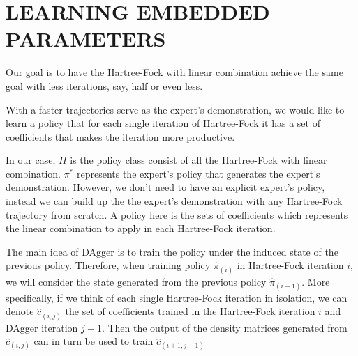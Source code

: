 \documentclass[twoside]{article}
\begin{document}

\section{LEARNING EMBEDDED PARAMETERS}

Our goal is to have the Hartree-Fock with linear combination achieve the same goal with less iterations, say, half or even less.  



% 

With a faster trajectories serve as the expert's demonstration, we would like to learn a policy that for each single iteration of Hartree-Fock it has a set of coefficients that makes the iteration more productive.   

In our case, $\Pi$ is the policy class consist of all the Hartree-Fock with linear combination. $\pi^*$ represents the expert's policy that generates the expert's demonstration. However, we don't need to have an explicit expert's policy, instead we can build up the the expert's demonstration with any Hartree-Fock trajectory from scratch. A policy here is the sets of coefficients which represents the linear combination to apply in each Hartree-Fock iteration. 




The main idea of DAgger is to train the policy under the induced state of the previous policy. Therefore, when training policy $\hat{\pi}_{(i)}$ in Hartree-Fock iteration $i$,
we will consider the state generated from the previous policy $\hat{\pi}_{(i-1)}$. More specifically, if we think of each single Hartree-Fock iteration in isolation, we can denote $\hat{c}_{(i,j)}$ the set of coefficients trained in the Hartree-Fock iteration $i$ and DAgger iteration $j-1$. Then the output of the density matrices generated from $\hat{c}_{(i,j)}$ can in turn be used to train $\hat{c}_{(i+1,j+1)}$
\end{document}
